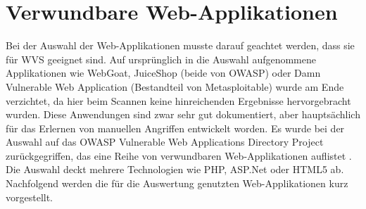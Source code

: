 \documentclass[12pt,oneside,a4paper,parskip]{scrbook}
\begin{document}
\section{Verwundbare Web-Applikationen}
  Bei der Auswahl der Web-Applikationen musste darauf geachtet werden, dass sie für WVS geeignet sind. Auf ursprünglich in die Auswahl aufgenommene Applikationen wie WebGoat, JuiceShop (beide von OWASP) oder Damn Vulnerable Web Application (Bestandteil von Metasploitable) wurde am Ende verzichtet, da hier beim Scannen keine hinreichenden Ergebnisse hervorgebracht wurden. Diese Anwendungen  sind zwar sehr gut dokumentiert, aber hauptsächlich für das Erlernen von manuellen Angriffen entwickelt worden. Es wurde bei der Auswahl auf das OWASP Vulnerable Web Applications Directory Project zurückgegriffen, das eine Reihe von verwundbaren Web-Applikationen auflistet \cite{OWASPWebApps}. Die Auswahl deckt mehrere Technologien wie PHP, ASP.Net oder HTML5 ab.
  Nachfolgend werden die für die Auswertung genutzten Web-Applikationen kurz vorgestellt.
\end{document}
